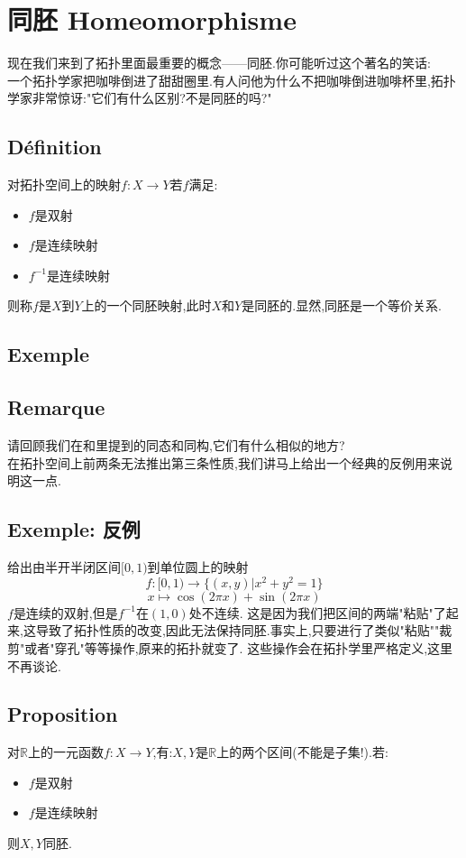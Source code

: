 \documentclass[12pt, a4paper, oneside]{ctexbook}
\begin{document}
\section{同胚 Homeomorphisme}
  现在我们来到了拓扑里面最重要的概念——同胚.你可能听过这个著名的笑话:\\

  一个拓扑学家把咖啡倒进了甜甜圈里.有人问他为什么不把咖啡倒进咖啡杯里,拓扑学家非常惊讶:"它们有什么区别?不是同胚的吗?"
  \subsection{Définition}
  对拓扑空间上的映射$f:X\rightarrow Y$若$f$满足:
  \begin{itemize}
    \item $f$是双射
    \item $f$是连续映射
    \item $f^{-1}$是连续映射
  \end{itemize}
  则称$f$是$X$到$Y$上的一个同胚映射,此时$X$和$Y$是同胚的.显然,同胚是一个等价关系.
  \subsection{Exemple}
  \subsection{Remarque}
  请回顾我们在和里提到的同态和同构,它们有什么相似的地方?\\

  在拓扑空间上前两条无法推出第三条性质,我们讲马上给出一个经典的反例用来说明这一点.
  \subsection{Exemple: 反例}
  给出由半开半闭区间$[0,1)$到单位圆上的映射
  $$
  f:[0,1)\rightarrow \{(x,y)|x^2+y^2=1\}
  $$
  $$
  x\mapsto\cos(2\pi x)+\sin(2\pi x)
  $$
  $f$是连续的双射,但是$f^{-1}$在$(1,0)$处不连续.
  这是因为我们把区间的两端"粘贴"了起来,这导致了拓扑性质的改变,因此无法保持同胚.事实上,只要进行了类似"粘贴""裁剪"或者"穿孔"等等操作,原来的拓扑就变了.
  这些操作会在拓扑学里严格定义,这里不再谈论.
  \subsection{Proposition}
  对$\mathbb{R}$上的一元函数$f:X\rightarrow Y$,有:$X,Y$是$\mathbb{R}$上的两个区间(不能是子集!).若:
  \begin{itemize}
    \item $f$是双射
    \item $f$是连续映射
  \end{itemize}
  则$X,Y$同胚.
\end{document}

